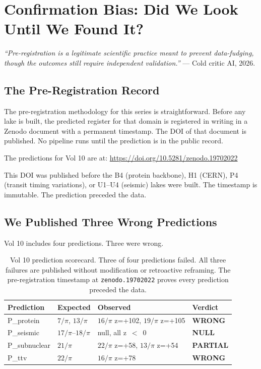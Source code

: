 \documentclass[11pt, letterpaper, openany]{book}
\begin{document}
\clearpage
\chapter{Confirmation Bias: Did We Look Until We Found It?}

\begin{objectionbox}
\textit{``Pre-registration is a legitimate scientific practice meant
to prevent data-fudging, though the outcomes still require independent
validation.''} --- Cold critic AI, 2026.
\end{objectionbox}

\section{The Pre-Registration Record}

The pre-registration methodology for this series is straightforward.
Before any lake is built, the predicted register for that domain
is registered in writing in a Zenodo document with a permanent
timestamp. The DOI of that document is published. No pipeline
runs until the prediction is in the public record.

The predictions for Vol 10 are at:
\url{https://doi.org/10.5281/zenodo.19702022}

This DOI was published before the B4 (protein backbone), H1 (CERN),
P4 (transit timing variations), or U1--U4 (seismic) lakes were built.
The timestamp is immutable. The prediction preceded the data.

\section{We Published Three Wrong Predictions}

Vol 10 includes four predictions. Three were wrong.

\begin{table}[H]
\centering
\renewcommand{\arraystretch}{1.4}
\small
\begin{tabular}{|l|l|l|l|}
\hline
\rowcolor{kishblue!10}
\textbf{Prediction} & \textbf{Expected} & \textbf{Observed} & \textbf{Verdict} \\
\hline\hline
P\_protein & $7/\pi$, $13/\pi$ & $16/\pi$ z=+102, $19/\pi$ z=+105 & \textbf{WRONG} \\
P\_seismic & $17/\pi$--$18/\pi$ & null, all z~$<$~0 & \textbf{NULL} \\
P\_subnuclear & $21/\pi$ & $22/\pi$ z=+58, $13/\pi$ z=+54 & \textbf{PARTIAL} \\
P\_ttv & $22/\pi$ & $16/\pi$ z=+78 & \textbf{WRONG} \\
\hline
\end{tabular}
\caption{Vol 10 prediction scorecard. Three of four predictions failed.
All three failures are published without modification or retroactive
reframing. The pre-registration timestamp at \texttt{zenodo.19702022}
proves every prediction preceded the data.}
\end{table}
\end{document}
